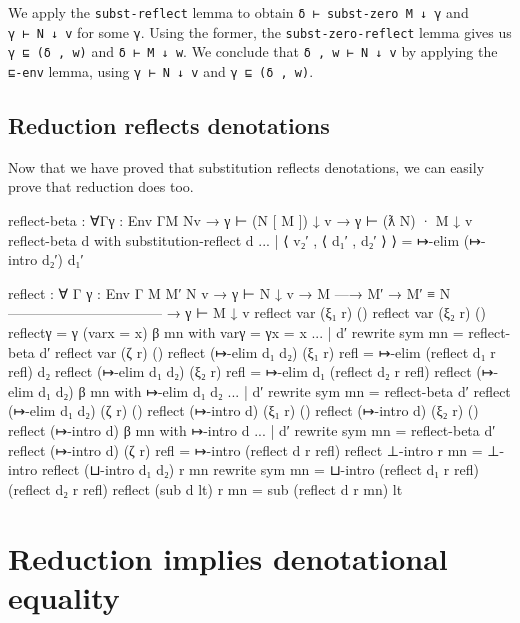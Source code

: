 We apply the \texttt{subst-reflect} lemma to obtain
\texttt{δ\ ⊢\ subst-zero\ M\ ↓\ γ} and \texttt{γ\ ⊢\ N\ ↓\ v} for some
\texttt{γ}. Using the former, the \texttt{subst-zero-reflect} lemma
gives us \texttt{γ\ ⊑\ (δ\ ,\ w)} and \texttt{δ\ ⊢\ M\ ↓\ w}. We
conclude that \texttt{δ\ ,\ w\ ⊢\ N\ ↓\ v} by applying the
\texttt{⊑-env} lemma, using \texttt{γ\ ⊢\ N\ ↓\ v} and
\texttt{γ\ ⊑\ (δ\ ,\ w)}.

\hypertarget{reduction-reflects-denotations-1}{%
\subsection{Reduction reflects
denotations}\label{reduction-reflects-denotations-1}}

Now that we have proved that substitution reflects denotations, we can
easily prove that reduction does too.

\begin{fence}
\begin{code}
reflect-beta : ∀{Γ}{γ : Env Γ}{M N}{v}
    → γ ⊢ (N [ M ]) ↓ v
    → γ ⊢ (ƛ N) · M ↓ v
reflect-beta d
    with substitution-reflect d
... | ⟨ v₂′ , ⟨ d₁′ , d₂′ ⟩ ⟩ = ↦-elim (↦-intro d₂′) d₁′


reflect : ∀ {Γ} {γ : Env Γ} {M M′ N v}
  → γ ⊢ N ↓ v  →  M —→ M′  →   M′ ≡ N
    ---------------------------------
  → γ ⊢ M ↓ v
reflect var (ξ₁ r) ()
reflect var (ξ₂ r) ()
reflect{γ = γ} (var{x = x}) β mn
    with var{γ = γ}{x = x}
... | d′ rewrite sym mn = reflect-beta d′
reflect var (ζ r) ()
reflect (↦-elim d₁ d₂) (ξ₁ r) refl = ↦-elim (reflect d₁ r refl) d₂
reflect (↦-elim d₁ d₂) (ξ₂ r) refl = ↦-elim d₁ (reflect d₂ r refl)
reflect (↦-elim d₁ d₂) β mn
    with ↦-elim d₁ d₂
... | d′ rewrite sym mn = reflect-beta d′
reflect (↦-elim d₁ d₂) (ζ r) ()
reflect (↦-intro d) (ξ₁ r) ()
reflect (↦-intro d) (ξ₂ r) ()
reflect (↦-intro d) β mn
    with ↦-intro d
... | d′ rewrite sym mn = reflect-beta d′
reflect (↦-intro d) (ζ r) refl = ↦-intro (reflect d r refl)
reflect ⊥-intro r mn = ⊥-intro
reflect (⊔-intro d₁ d₂) r mn rewrite sym mn =
   ⊔-intro (reflect d₁ r refl) (reflect d₂ r refl)
reflect (sub d lt) r mn = sub (reflect d r mn) lt
\end{code}
\end{fence}

\hypertarget{reduction-implies-denotational-equality}{%
\section{Reduction implies denotational
equality}\label{reduction-implies-denotational-equality}}

